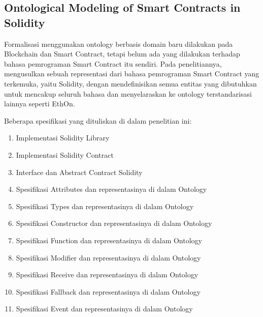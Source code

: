 \subsection{Ontological Modeling of Smart Contracts in Solidity}
\label{subsec:solidity-ontology}

Formalisasi menggunakan ontology berbasis domain baru dilakukan pada Blockchain dan Smart Contract, tetapi belum ada yang dilakukan terhadap bahasa pemrograman Smart Contract itu sendiri. Pada penelitiannya, \cite{cano2021toward} mengusulkan sebuah representasi dari bahasa pemrograman Smart Contract yang terkemuka, yaitu Solidity, dengan mendefinisikan semua entitas yang dibutuhkan untuk mencakup seluruh bahasa dan menyelaraskan ke ontology terstandarisasi lainnya seperti EthOn.

Beberapa spesifikasi yang dituliskan di dalam penelitian ini:

\begin{enumerate}
	\item Implementasi Solidity Library
	\item Implementasi Solidity Contract
	\item Interface dan Abstract Contract Solidity
	\item Spesifikasi Attributes dan representasinya di dalam Ontology
	\item Spesifikasi Types dan representasinya di dalam Ontology
	\item Spesifikasi Constructor dan representasinya di dalam Ontology
	\item Spesifikasi Function dan representasinya di dalam Ontology
	\item Spesifikasi Modifier dan representasinya di dalam Ontology
	\item Spesifikasi Receive dan representasinya di dalam Ontology
	\item Spesifikasi Fallback dan representasinya di dalam Ontology
	\item Spesifikasi Event dan representasinya di dalam Ontology
\end{enumerate}